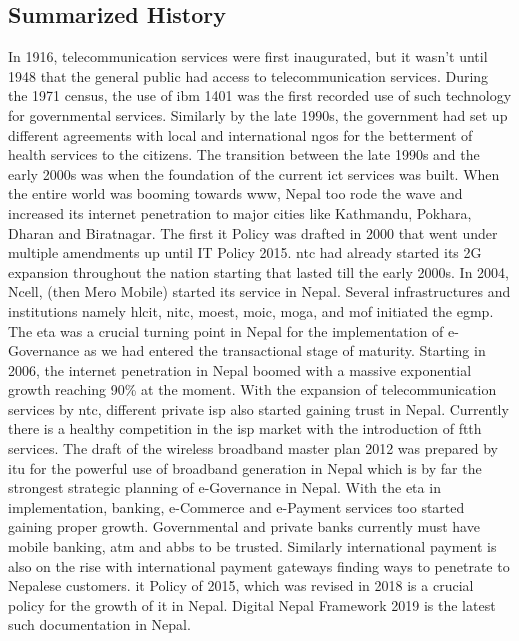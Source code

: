\documentclass{home_assignment}
\begin{document}
    \subsection{Summarized History}
    In 1916, telecommunication services were first inaugurated, but it wasn't until 1948  that the general public had access to telecommunication services. During the 1971  census, the use of \acrshort{ibm} 1401 was the first recorded use of such technology for governmental services. Similarly by the late 1990s, the government had set up different agreements with local and international \acrshort{ngo}s for the betterment of health services to the citizens. The transition between the late 1990s and the early 2000s was when the foundation of the current \acrshort{ict} services was built. When the entire world was booming towards \acrfull{www}, Nepal too rode the wave and increased its internet penetration to major cities like Kathmandu, Pokhara, Dharan and Biratnagar. The first \acrshort{it} Policy was drafted in 2000  that went under multiple amendments up until IT Policy 2015. \acrfull{ntc} had already started its 2G expansion throughout the nation starting that lasted till the early 2000s. In 2004, Ncell, (then Mero Mobile) started its service in Nepal. Several infrastructures and institutions namely \acrfull{hlcit}, \acrfull{nitc}, \acrfull{moest}, \acrfull{moic}, \acrfull{moga}, and \acrfull{mof} initiated the \acrfull{egmp}. The \acrfull{eta} was a crucial turning point in Nepal for the implementation of e-Governance as we had entered the transactional stage of maturity. Starting in 2006, the internet penetration in Nepal boomed with a massive exponential growth reaching 90\% at the moment. With the expansion of telecommunication services by \acrshort{ntc}, different private \acrfull{isp} also started gaining trust in Nepal. Currently there is a healthy competition in the \acrshort{isp} market with the introduction of \acrfull{ftth} services. The draft of the wireless broadband master plan 2012 was prepared by \acrshort{itu} for the powerful use of broadband generation in Nepal which is by far the strongest strategic planning of e-Governance in Nepal. With the \acrshort{eta} in implementation, banking, e-Commerce and e-Payment services too started gaining proper growth. Governmental and private banks currently must have mobile banking, \acrshort{atm} and \acrfull{abbs} to be trusted. Similarly international payment is also on the rise with international payment gateways finding ways to penetrate to Nepalese customers. \acrshort{it} Policy of 2015, which was revised in 2018 is a crucial policy for the growth of \acrshort{it} in Nepal. Digital Nepal Framework 2019 is the latest such documentation in Nepal.
\end{document}
